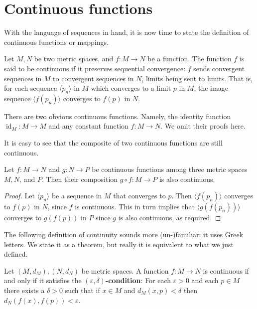 \section{Continuous functions}
\label{sec:continuous}

With the language of sequences in hand, it is now time to state the definition of continuous functions or mappings.

\begin{defn}
  Let $M, N$ be two metric spaces, and $f : M \to N$ be a function.
  The function $f$ is said to be \textsf{continuous} if it preserves sequential convergence: $f$ sends convergent sequences in $M$ to convergent sequences in $N$, limits being sent to limits.
  That is, for each sequence $\langle p_n \rangle$ in $M$ which converges to a limit $p$ in $M$, the image sequence $\langle f(p_n) \rangle$ converges to $f(p)$ in $N$.
\end{defn}

There are two obvious continuous functions.  Namely, the identity function $\operatorname{id}_M: M \to M$ and any constant function $f: M \to N$.
We omit their proofs here.

It is easy to see that the composite of two continuous functions are still continuous.

\begin{thm}
  Let $f: M \to N$ and $g: N \to P$ be continuous functions among three metric spaces $M, N$, and $P$.  Then their composition $g \circ f : M \to P$ is also continuous.
\end{thm}

\begin{proof}
  Let $\langle p_n \rangle$ be a sequence in $M$ that converges to $p$.
  Then $\langle f(p_n) \rangle$ converges to $f(p)$ in $N$, since $f$ is continuous.
  This in turn implies that $\langle g(f(p_n)) \rangle$ converges to $g(f(p))$ in $P$ since $g$ is also continuous, as required.
\end{proof}

The following definition of continuity sounds more (un-)familiar: it uses Greek letters.
We state it as a theorem, but really it is equivalent to what we just defined.

\begin{thm}
  Let $(M, d_M), (N, d_N)$ be metric spaces.
  A function $f: M \to N$ is continuous if and only if it satisfies the \textbf{$(\varepsilon,\delta)$-condition}: For each $\varepsilon > 0$ and each $p \in M$ there exists a $\delta > 0$ such that if $x \in M$ and $d_M(x,p) < \delta$ then $d_N\left( f(x), f(p) \right) < \varepsilon$.
\end{thm}

